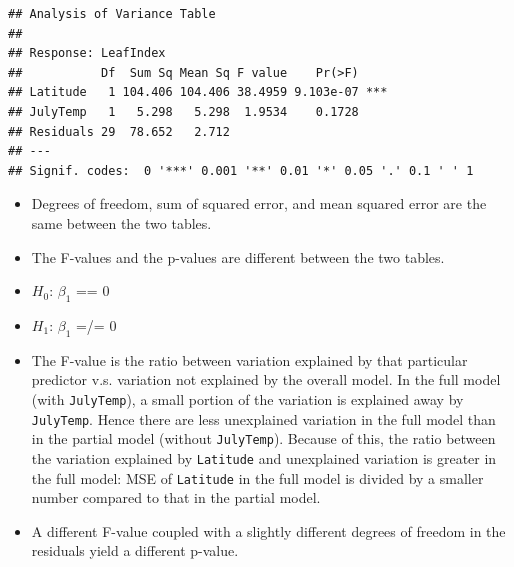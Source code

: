 \documentclass[]{article}
\providecommand{\tightlist}{%
  \setlength{\itemsep}{0pt}\setlength{\parskip}{0pt}}
\begin{document}
\begin{verbatim}
## Analysis of Variance Table
## 
## Response: LeafIndex
##           Df  Sum Sq Mean Sq F value    Pr(>F)    
## Latitude   1 104.406 104.406 38.4959 9.103e-07 ***
## JulyTemp   1   5.298   5.298  1.9534    0.1728    
## Residuals 29  78.652   2.712                      
## ---
## Signif. codes:  0 '***' 0.001 '**' 0.01 '*' 0.05 '.' 0.1 ' ' 1
\end{verbatim}

\begin{itemize}
\tightlist
\item
  Degrees of freedom, sum of squared error, and mean squared error are
  the same between the two tables.
\item
  The F-values and the p-values are different between the two tables.
\item
  \(H_{0}\): \(\beta_{1}\) == 0
\item
  \(H_{1}\): \(\beta_{1}\) =/= 0
\item
  The F-value is the ratio between variation explained by that
  particular predictor v.s. variation not explained by the overall
  model. In the full model (with \texttt{JulyTemp}), a small portion of
  the variation is explained away by \texttt{JulyTemp}. Hence there are
  less unexplained variation in the full model than in the partial model
  (without \texttt{JulyTemp}). Because of this, the ratio between the
  variation explained by \texttt{Latitude} and unexplained variation is
  greater in the full model: MSE of \texttt{Latitude} in the full model
  is divided by a smaller number compared to that in the partial model.
\item
  A different F-value coupled with a slightly different degrees of
  freedom in the residuals yield a different p-value.
\end{itemize}
\end{document}
